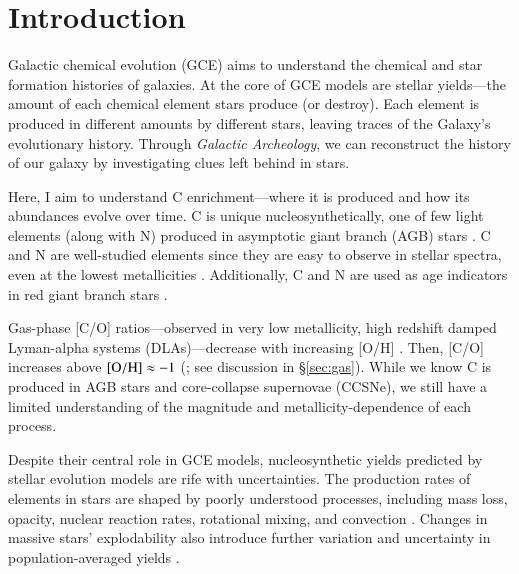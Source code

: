 \documentclass[12pt,oneside]{report}
\begin{document}

\tableofcontents
\listoffigures
\listoftables
\newpage
{}



\chapter{Introduction}

Galactic chemical evolution (GCE) aims to understand the chemical and star formation histories of galaxies. At the core of GCE models are stellar yields---the amount of each chemical element stars produce (or destroy). Each element is produced in different amounts by different stars, leaving traces of the Galaxy's evolutionary history. Through \textit{Galactic Archeology}, we can reconstruct the history of our galaxy by investigating clues left behind in stars.

Here, I aim to understand C enrichment---where it is produced and how its abundances evolve over time. C is unique nucleosynthetically, one of few light elements (along with N) produced in asymptotic giant branch (AGB) stars \citep[e.g.][]{jennifer19, KL14}. C and N are well-studied elements since they are easy to observe in stellar spectra, even at the lowest metallicities \cite[e.g.][]{fabbian+09, nissen+14, lambert81, laird85, lambert86}. Additionally, C and N are used as age indicators in red giant branch stars \citep{martig16, MG15, hasselquist19, vincenzo+21}.

Gas-phase [C/O] ratios---observed in very low metallicity, high redshift damped Lyman-alpha systems (DLAs)---decrease with increasing [O/H] \citep{FN15, cooke+17}. Then, [C/O] increases above $\rm [O/H] \approx -1$ (\citealt{berg+19}; see discussion in \S\ref{sec:gas}).
While we know C is produced in AGB stars and core-collapse supernovae (CCSNe), we still have a limited understanding of the magnitude and metallicity-dependence of each process.


Despite their central role in GCE models, nucleosynthetic yields predicted by stellar evolution models are rife with uncertainties. The production rates of elements in stars are shaped by poorly understood processes, including mass loss, opacity, nuclear reaction rates, rotational mixing, and convection \citep{KL14,ventura+13, LC18}.
Changes in massive stars' explodability also introduce further variation and uncertainty in population-averaged yields \citep{emily+21}.
\end{document}
